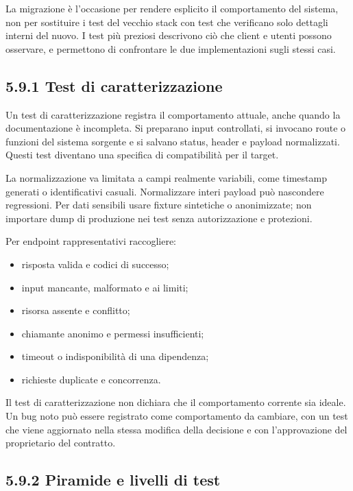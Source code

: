 \documentclass[
  italian,
  10pt,
]{book}
\providecommand{\tightlist}{%
  \setlength{\itemsep}{0pt}\setlength{\parskip}{0pt}}
\begin{document}
La migrazione è l'occasione per rendere esplicito il comportamento del
sistema, non per sostituire i test del vecchio stack con test che
verificano solo dettagli interni del nuovo. I test più preziosi
descrivono ciò che client e utenti possono osservare, e permettono di
confrontare le due implementazioni sugli stessi casi.

\subsection{5.9.1 Test di
caratterizzazione}\label{test-di-caratterizzazione}

Un test di caratterizzazione registra il comportamento attuale, anche
quando la documentazione è incompleta. Si preparano input controllati,
si invocano route o funzioni del sistema sorgente e si salvano status,
header e payload normalizzati. Questi test diventano una specifica di
compatibilità per il target.

La normalizzazione va limitata a campi realmente variabili, come
timestamp generati o identificativi casuali. Normalizzare interi payload
può nascondere regressioni. Per dati sensibili usare fixture sintetiche
o anonimizzate; non importare dump di produzione nei test senza
autorizzazione e protezioni.

Per endpoint rappresentativi raccogliere:

\begin{itemize}
\tightlist
\item
  risposta valida e codici di successo;
\item
  input mancante, malformato e ai limiti;
\item
  risorsa assente e conflitto;
\item
  chiamante anonimo e permessi insufficienti;
\item
  timeout o indisponibilità di una dipendenza;
\item
  richieste duplicate e concorrenza.
\end{itemize}

Il test di caratterizzazione non dichiara che il comportamento corrente
sia ideale. Un bug noto può essere registrato come comportamento da
cambiare, con un test che viene aggiornato nella stessa modifica della
decisione e con l'approvazione del proprietario del contratto.

\subsection{5.9.2 Piramide e livelli di
test}\label{piramide-e-livelli-di-test}
\end{document}
